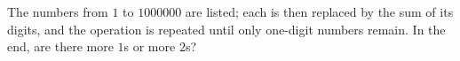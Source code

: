 The numbers from $1$ to $1000000$ are listed; each is then replaced by the sum of its digits, and the operation is repeated until only one-digit numbers remain. In the end, are there more $1$s or more $2$s?
